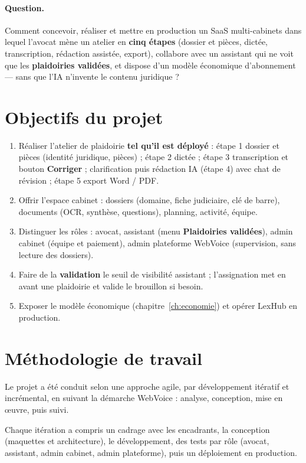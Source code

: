 \paragraph{Question.}
Comment concevoir, réaliser et mettre en production un SaaS multi-cabinets dans lequel l'avocat mène un atelier en \textbf{cinq étapes} (dossier et pièces, dictée, transcription, rédaction assistée, export), collabore avec un assistant qui ne voit que les \textbf{plaidoiries validées}, et dispose d'un modèle économique d'abonnement --- sans que l'IA n'invente le contenu juridique ?

\section{Objectifs du projet}

\begin{enumerate}[label=\textbf{O\arabic*.}]
  \item Réaliser l'atelier de plaidoirie \textbf{tel qu'il est déployé} : étape 1 dossier et pièces (identité juridique, pièces) ; étape 2 dictée ; étape 3 transcription et bouton \textbf{Corriger} ; clarification puis rédaction IA (étape 4) avec chat de révision ; étape 5 export Word / PDF.
  \item Offrir l'espace cabinet : dossiers (domaine, fiche judiciaire, clé de barre), documents (OCR, synthèse, questions), planning, activité, équipe.
  \item Distinguer les rôles : avocat, assistant (menu \textbf{Plaidoiries validées}), admin cabinet (équipe et paiement), admin plateforme WebVoice (supervision, sans lecture des dossiers).
  \item Faire de la \textbf{validation} le seuil de visibilité assistant ; l'assignation met en avant une plaidoirie et valide le brouillon si besoin.
  \item Exposer le modèle économique (chapitre~\ref{ch:economie}) et opérer LexHub en production.
\end{enumerate}

\section{Méthodologie de travail}

Le projet a été conduit selon une approche agile, par développement itératif et incrémental, en suivant la démarche WebVoice : analyse, conception, mise en œuvre, puis suivi.

Chaque itération a compris un cadrage avec les encadrants, la conception (maquettes et architecture), le développement, des tests par rôle (avocat, assistant, admin cabinet, admin plateforme), puis un déploiement en production.

